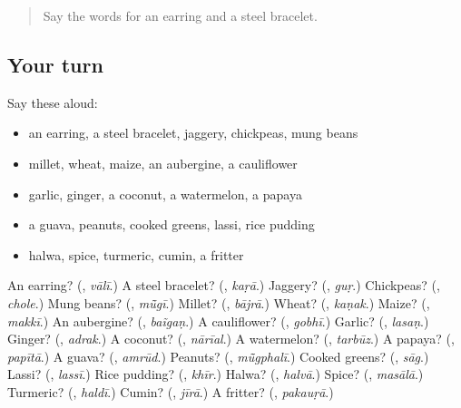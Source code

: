 \begin{quote}
Say the words for an earring and a steel bracelet.
\end{quote}

\subsection*{Your turn}
Say these aloud:

\begin{itemize}
\raggedright
  \item an earring, a steel bracelet, jaggery, chickpeas, mung beans
  \item millet, wheat, maize, an aubergine, a cauliflower
  \item garlic, ginger, a coconut, a watermelon, a papaya
  \item a guava, peanuts, cooked greens, lassi, rice pudding
  \item halwa, spice, turmeric, cumin, a fritter
\end{itemize}

\begin{tcolorbox}[breakable,colback=teal!4,colframe=teal!35!black,title={Before you move on}]
An earring? (\textbf{}, \emph{vālī}.) A steel bracelet? (\textbf{}, \emph{kaṛā}.) Jaggery? (\textbf{}, \emph{guṛ}.) Chickpeas? (\textbf{}, \emph{chole}.) Mung beans? (\textbf{}, \emph{mū̃gī}.) Millet? (\textbf{}, \emph{bājrā}.) Wheat? (\textbf{}, \emph{kaṇak}.) Maize? (\textbf{}, \emph{makkī}.) An aubergine? (\textbf{}, \emph{baĩgaṇ}.) A cauliflower? (\textbf{}, \emph{gobhī}.) Garlic? (\textbf{}, \emph{lasaṇ}.) Ginger? (\textbf{}, \emph{adrak}.) A coconut? (\textbf{}, \emph{nārīal}.) A watermelon? (\textbf{}, \emph{tarbūz}.) A papaya? (\textbf{}, \emph{papītā}.) A guava? (\textbf{}, \emph{amrūd}.) Peanuts? (\textbf{}, \emph{mū̃gphalī}.) Cooked greens? (\textbf{}, \emph{sāg}.) Lassi? (\textbf{}, \emph{lassī}.) Rice pudding? (\textbf{}, \emph{khīr}.) Halwa? (\textbf{}, \emph{halvā}.) Spice? (\textbf{}, \emph{masālā}.) Turmeric? (\textbf{}, \emph{haldī}.) Cumin? (\textbf{}, \emph{jīrā}.) A fritter? (\textbf{}, \emph{pakauṛā}.)
\end{tcolorbox}
